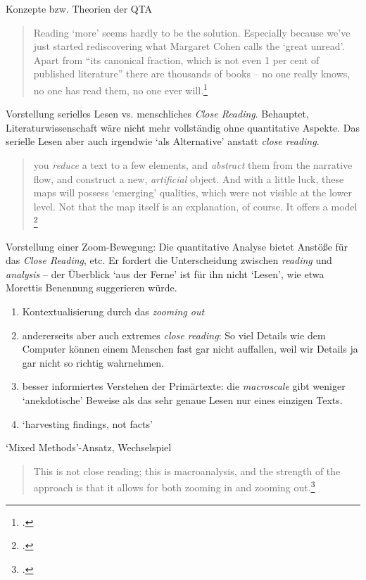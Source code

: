\documentclass[10pt]{beamer}
\begin{document}
\begin{frame}[allowframebreaks]{Konzepte bzw. Theorien der QTA}
\begin{quote}
    Reading `more' seems hardly to be the solution. Especially because we've just started rediscovering what Margaret Cohen calls the `great unread'. \lbrack{} Apart from ``its canonical fraction, which is not even 1 per cent of published literature''\rbrack{} there are \lbrack{}thousands of books\rbrack{} -- no one really knows, no one has read them, no one ever will.\footcite[45]{distantreading} 
\end{quote}

Vorstellung serielles Lesen vs. menschliches \emph{Close Reading}. 
Behauptet, Literaturwissenschaft wäre nicht mehr vollständig ohne quantitative Aspekte. Das serielle Lesen aber auch irgendwie `als Alternative' anstatt \emph{close reading}.

\begin{quote}
    \punkti you \emph{reduce} a text to a few elements, and \emph{abstract} them from the narrative flow, and construct a new, \emph{artificial} object. \punkti And with a little luck, these maps will \punkti possess `emerging' qualities, which were not visible at the lower level. \punkti Not that the map itself is an explanation, of course. It offers a model \punkti\footcite[53]{graphsmoretti} 
\end{quote}


\bigskip

Vorstellung einer Zoom-Bewegung: Die quantitative Analyse bietet Anstöße für das \emph{Close Reading}, etc.
Er fordert die Unterscheidung zwischen \emph{reading} und \emph{analysis} -- der Überblick `aus der Ferne' ist für ihn nicht `Lesen', wie etwa Morettis Benennung suggerieren würde.
\begin{enumerate}
    \item Kontextualisierung durch das \emph{zooming out}
    \item andererseits aber auch extremes \emph{close reading}: So viel Details wie dem Computer können einem Menschen fast gar nicht auffallen, weil wir Details ja gar nicht so richtig wahrnehmen.
    \item besser informiertes Verstehen der Primärtexte: die \emph{macroscale} gibt weniger `anekdotische' Beweise als das sehr genaue Lesen nur eines einzigen Texts.
    \item `harvesting findings, not facts'
\end{enumerate}

`Mixed Methods'-Ansatz, Wechselspiel

\begin{quote}
    This is not close reading; this is macroanalysis, and the strength of the approach is that it allows for both zooming in and zooming out.\footcite[23]{macroanalysis}
\end{quote}


\end{frame}
\end{document}

